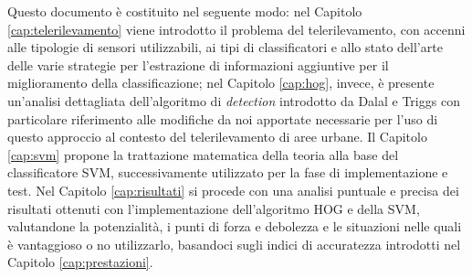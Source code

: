 Questo documento è costituito nel seguente modo: nel Capitolo \ref{cap:telerilevamento} viene introdotto il problema del telerilevamento, con accenni alle tipologie di sensori utilizzabili, ai tipi di classificatori e allo stato dell'arte delle varie strategie per l'estrazione di informazioni aggiuntive per il miglioramento della classificazione; nel Capitolo \ref{cap:hog}, invece, è presente un'analisi dettagliata dell'algoritmo di \emph{detection} introdotto da Dalal e Triggs \citep{Art_HOGHuman} con particolare riferimento alle modifiche da noi apportate necessarie per l'uso di questo approccio al contesto del telerilevamento di aree urbane. Il Capitolo \ref{cap:svm} propone la trattazione matematica della teoria alla base del classificatore SVM, successivamente utilizzato per la fase di implementazione e test. 
Nel Capitolo \ref{cap:risultati} si procede con una analisi puntuale e precisa dei risultati ottenuti con l'implementazione dell'algoritmo HOG e della SVM, valutandone la potenzialità, i punti di forza e debolezza e le situazioni nelle quali è vantaggioso o no utilizzarlo, basandoci sugli indici di accuratezza introdotti nel Capitolo \ref{cap:prestazioni}.